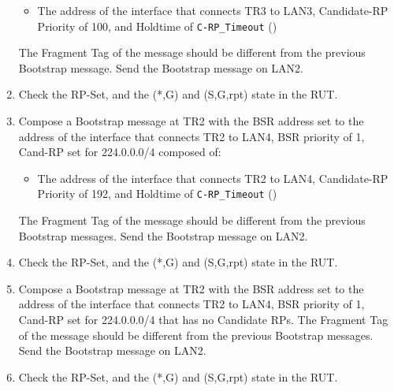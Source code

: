 \documentclass[11pt]{report}
\begin{document}
\begin{enumerate}
\begin{itemize}
    \item The address of the interface that connects TR3 to LAN3,
    Candidate-RP Priority of 100, and Holdtime of \verb=C-RP_Timeout=
    ({\PimsmCRPTimeout})

  \end{itemize}
  The Fragment Tag of the message should be different from the previous
  Bootstrap message.
  Send the Bootstrap message on LAN2.

  \item Check the RP-Set, and the (*,G) and (S,G,rpt) state in the RUT.

  \item Compose a Bootstrap message at TR2 with
  the BSR address set to the address of the interface that connects TR2 to
  LAN4, BSR priority of 1, Cand-RP set for 224.0.0.0/4 composed of:

  \begin{itemize}

    \item The address of the interface that connects TR2 to LAN4,
    Candidate-RP Priority of 192, and Holdtime of \verb=C-RP_Timeout=
    ({\PimsmCRPTimeout})

  \end{itemize}
  The Fragment Tag of the message should be different from the previous
  Bootstrap messages.
  Send the Bootstrap message on LAN2.

  \item Check the RP-Set, and the (*,G) and (S,G,rpt) state in the RUT.

  \item Compose a Bootstrap message at TR2 with
  the BSR address set to the address of the interface that connects TR2 to
  LAN4, BSR priority of 1, Cand-RP set for 224.0.0.0/4 that has no Candidate
  RPs.
  The Fragment Tag of the message should be different from the previous
  Bootstrap messages.
  Send the Bootstrap message on LAN2.

  \item Check the RP-Set, and the (*,G) and (S,G,rpt) state in the RUT.

\end{enumerate}


\end{document}
